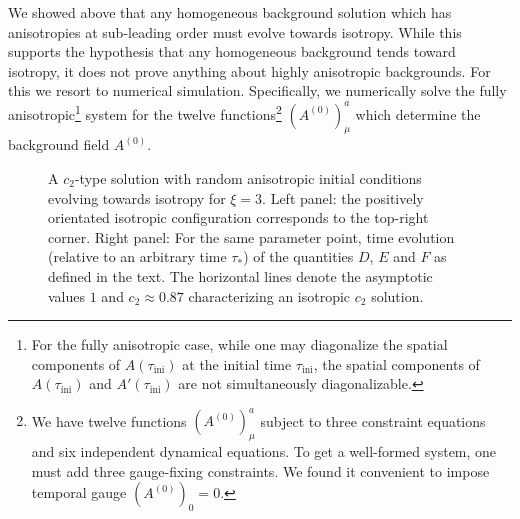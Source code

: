 We showed above that any homogeneous background solution which has anisotropies at sub-leading order must evolve towards isotropy. While this supports the hypothesis that any homogeneous background tends toward isotropy, it does not prove anything about highly anisotropic backgrounds. For this we resort to numerical simulation. Specifically, we numerically solve the fully anisotropic\footnote{For the fully anisotropic case, while one may diagonalize the spatial components of $A(\tau_{\mathrm{ini}})$ at the initial time $\tau_{\mathrm{ini}}$, the spatial components of $A(\tau_{\mathrm{ini}})$ and $A'(\tau_{\mathrm{ini}})$ are not simultaneously diagonalizable.} system  for the twelve functions\footnote{We have twelve functions $(A^{(0)})_{\mu}^{a}$ subject to three constraint equations and six independent dynamical equations. To get a well-formed system, one must add three gauge-fixing constraints. We found it convenient to impose temporal gauge $\left(A^{(0)}\right)_{0}=0$.} $(A^{(0)})_{\mu}^{a}$ which determine the background field $A^{(0)}$.

\begin{figure}[t]
\centering{} \hfill{} \caption{\label{fig:c2-iso} A $c_{2}$\protect\nobreakdash-type solution with random anisotropic initial conditions evolving towards isotropy for $\xi=3$. Left panel: the positively orientated isotropic configuration corresponds to the top-right corner. Right panel: For the same parameter point, time evolution (relative to an arbitrary time $\tau_{*}$) of the quantities $D$, $E$ and $F$ as defined in the text. The horizontal lines denote the asymptotic values $1$ and $c_{2}\approx0.87$ characterizing an isotropic $c_{2}$ solution. }
\end{figure}

